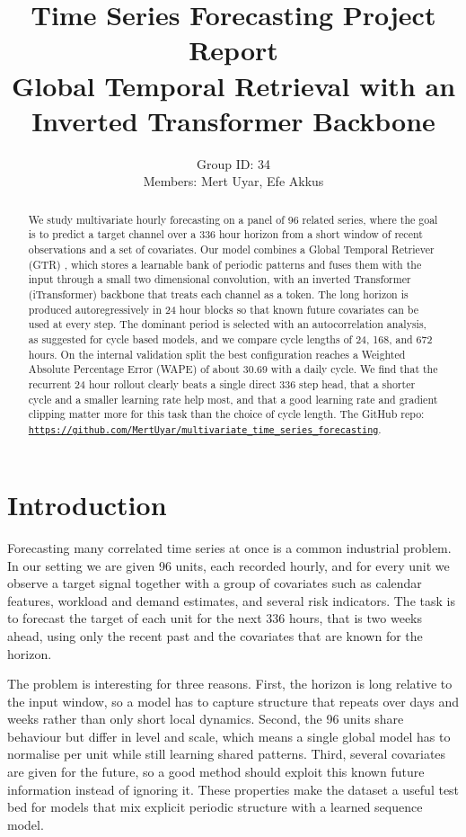\documentclass[11pt]{article}
\title{Time Series Forecasting Project Report\\
\large Global Temporal Retrieval with an Inverted Transformer Backbone}
\author{Group ID: 34 \\ Members: Mert Uyar, Efe Akkus}
\date{}
\begin{document}
\maketitle

\begin{abstract}
We study multivariate hourly forecasting on a panel of 96 related series, where the goal
is to predict a target channel over a 336 hour horizon from a short window of recent
observations and a set of covariates. Our model combines a Global Temporal Retriever (GTR) \cite{cao2026gtr},
which stores a learnable bank of periodic patterns and fuses them with the input through a
small two dimensional convolution, with an inverted Transformer (iTransformer) backbone that
treats each channel as a token. The long horizon is produced autoregressively in 24 hour
blocks so that known future covariates can be used at every step. The dominant period is
selected with an autocorrelation analysis, as suggested for cycle based models, and we compare
cycle lengths of 24, 168, and 672 hours. On the internal validation split the best
configuration reaches a Weighted Absolute Percentage Error (WAPE) of about 30.69 with a daily
cycle. We find that the recurrent 24 hour rollout clearly beats a single direct 336 step head,
that a shorter cycle and a smaller learning rate help most, and that a good learning rate and
gradient clipping matter more for this task than the choice of cycle length. The GitHub repo: 
\href{https://github.com/MertUyar/multivariate_time_series_forecasting}{\texttt{https://github.com/MertUyar/multivariate\_time\_series\_forecasting}}.
\end{abstract}

\section{Introduction}
Forecasting many correlated time series at once is a common industrial problem. In our setting
we are given 96 units, each recorded hourly, and for every unit we observe a target signal
together with a group of covariates such as calendar features, workload and demand estimates,
and several risk indicators. The task is to forecast the target of each unit for the next
336 hours, that is two weeks ahead, using only the recent past and the covariates that are
known for the horizon.

The problem is interesting for three reasons. First, the horizon is long relative to the input
window, so a model has to capture structure that repeats over days and weeks rather than only
short local dynamics. Second, the 96 units share behaviour but differ in level and scale, which
means a single global model has to normalise per unit while still learning shared patterns.
Third, several covariates are given for the future, so a good method should exploit this known
future information instead of ignoring it. These properties make the dataset a useful test bed
for models that mix explicit periodic structure with a learned sequence model.
\end{document}
